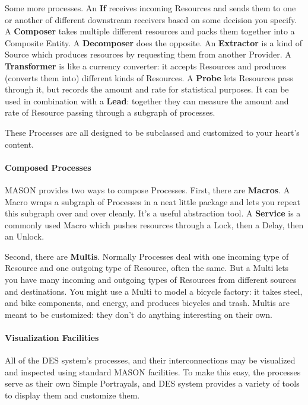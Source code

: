 \documentclass[twoside,10pt]{article}
\begin{document}
Some more processes.  An {\bf If} receives incoming Resources and sends them to one or another of different downstream receivers based on some decision you specify.  A {\bf Composer} takes multiple different resources and packs them together into a Composite Entity.  A {\bf Decomposer} does the opposite.  An {\bf Extractor} is a kind of Source which produces resources by requesting them from another Provider.  A {\bf Transformer} is like a currency converter: it accepts Resources and produces (converts them into) different kinds of Resources.  A {\bf Probe} lets Resources pass through it, but records the amount and rate for statistical purposes.  It can be used in combination with a {\bf Lead}: together they can measure the amount and rate of Resource passing through a subgraph of processes.

These Processes are all designed to be subclassed and customized to your heart's content.

\paragraph{Composed Processes}

MASON provides two ways to compose Processes.  First, there are {\bf Macros}.  A Macro wraps a subgraph of Processes in a neat little package and lets you repeat this subgraph over and over cleanly.  It's a useful abstraction tool.  A {\bf Service} is a commonly used Macro which pushes resources through a Lock, then a Delay, then an Unlock.

Second, there are {\bf Multis}.  Normally Processes deal with one incoming type of Resource and one outgoing type of Resource, often the same.  But a Multi lets you have many incoming and outgoing types of Resources from different sources and destinations. You might use a Multi to model a bicycle factory: it takes steel, and bike components, and energy, and produces bicycles and trash.  Multis are meant to be customized: they don't do anything interesting on their own.

\paragraph{Visualization Facilities}

All of the DES system's processes, and their interconnections may be visualized and inspected using standard MASON facilities.  To make this easy, the processes serve as their own Simple Portrayals, and DES system provides a variety of tools to display them and customize them.
  
\end{document}
